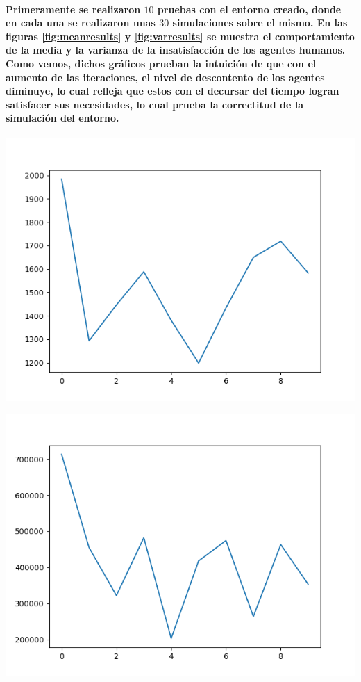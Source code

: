 \documentclass[12pt]{amsart}
\begin{document}
\paragraph{Primeramente se realizaron $10$ pruebas con el entorno creado, donde en cada una se realizaron unas $30$ simulaciones sobre el mismo. En las figuras \ref{fig:meanresults} y \ref{fig:varresults} se muestra el comportamiento de la media y la varianza de la insatisfacción de los agentes humanos. Como vemos, dichos gráficos prueban la intuición de que con el aumento de las iteraciones, el nivel de descontento de los agentes diminuye, lo cual refleja que estos con el decursar del tiempo logran satisfacer sus necesidades, lo cual prueba la correctitud de la simulación del entorno.}

\begin{center}
	\includegraphics[scale=0.7]{./images/meanresults.png}
	\label{fig:meanresults}
\end{center}

\begin{center}
	\includegraphics[scale=0.7]{./images/varresults.png}
	\label{fig:varresults}
\end{center}
\end{document}
